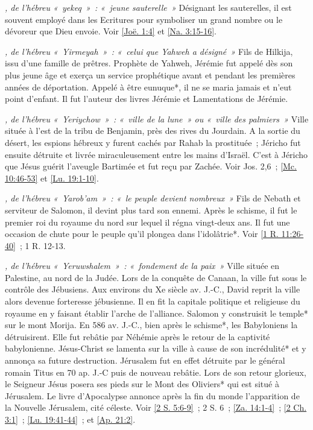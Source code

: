 \begin{multicols}{2}
\textit{, de l'hébreu «~yekeq~»~: «~jeune sauterelle~»}\newline
Désignant les sauterelles, il est souvent employé dans les Ecritures pour symboliser un grand nombre ou le dévoreur que Dieu envoie. Voir \vref{Joë. 1:4} et \vref{Na. 3:15-16}.

\textit{, de l'hébreu «~Yirmeyah~»~: «~celui que Yahweh a désigné~»}\newline
Fils de Hilkija, issu d'une famille de prêtres. Prophète de Yahweh, Jérémie fut appelé dès son plus jeune âge et exerça un service prophétique avant et pendant les premières années de déportation. Appelé à être eunuque*, il ne se maria jamais et n'eut point d'enfant. Il fut l'auteur des livres Jérémie et Lamentations de Jérémie.

\textit{, de l'hébreu «~Yeriychow~»~: «~ville de la lune~» ou «~ville des palmiers~»}\newline
Ville située à l'est de la tribu de Benjamin, près des rives du Jourdain. A la sortie du désert, les espions hébreux y furent cachés par Rahab la prostituée~; Jéricho fut ensuite détruite et livrée miraculeusement entre les mains d'Israël. C'est à Jéricho que Jésus guérit l'aveugle Bartimée et fut reçu par Zachée. Voir Jos. 2,6~; \vref{Mc. 10:46-53} et \vref{Lu. 19:1-10}.

\textit{, de l'hébreu «~Yarob'am~»~: «~le peuple devient nombreux~»}\newline
Fils de Nebath et serviteur de Salomon, il devint plus tard son ennemi. Après le schisme, il fut le premier roi du royaume du nord sur lequel il régna vingt-deux ans. Il fut une occasion de chute pour le peuple qu'il plongea dans l'idolâtrie*. Voir \vref{1 R. 11:26-40}~; 1 R. 12-13.

\textit{, de l'hébreu «~Yeruwshalem~»~: «~fondement de la paix~»}\newline
Ville située en Palestine, au nord de la Judée. Lors de la conquête de Canaan, la ville fut sous le contrôle des Jébusiens. Aux environs du Xe siècle av. J.-C., David reprit la ville alors devenue forteresse jébusienne. Il en fit la capitale politique et religieuse du royaume en y faisant établir l'arche de l'alliance. Salomon y construisit le temple* sur le mont Morija. En 586 av. J.-C., bien après le schisme*, les Babyloniens la détruisirent. Elle fut rebâtie par Néhémie après le retour de la captivité babylonienne. Jésus-Christ se lamenta sur la ville à cause de son incrédulité* et y annonça sa future destruction. Jérusalem fut en effet détruite par le général romain Titus en 70 ap. J.-C puis de nouveau rebâtie. Lors de son retour glorieux, le Seigneur Jésus posera ses pieds sur le Mont des Oliviers* qui est situé à Jérusalem. Le livre d'Apocalypse annonce après la fin du monde l'apparition de la Nouvelle Jérusalem, cité céleste.\newline
Voir \vref{2 S. 5:6-9}~; 2 S. 6~; \vref{Za. 14:1-4}~; \vref{2 Ch. 3:1}~; \vref{Lu. 19:41-44}~; et \vref{Ap. 21:2}.


\end{multicols}
